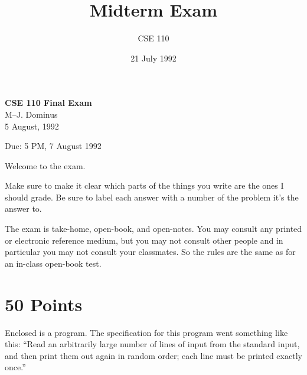 

\def\brac#1{$<$#1$>$}
\def\Int{{\tt int}}
\def\int{\brac{\Int}}
\def\int{\brac{\Int}}
\def\Shortint{{\tt short~int}}
\def\shortint{\brac{\Shortint}}
\def\Longint{{\tt long~int}}
\def\longint{\brac{\Longint}}
\def\Float{{\tt float}}
\def\float{\brac{\Float}}
\def\Double{{\tt double}}
\def\double{\brac{\Double}}
\def\Char{{\tt char}}
\def\chr{\brac{\Char}}
\def\Void{{\tt void}}
\def\void{\brac{\Void}}

\def\ptr#1{pointer~to #1}
\def\p2#1{\brac{\ptr#1}}
\def\Ano#1#2{array~of {#1}~#2s}
\def\ano#1#2{\brac{\Ano#1#2}}
\def\Ao#1{array~of #1}
\def\ao#1{\brac{\Ao#1}}

\def\breakhere{\mbox{$\otimes$}}
\parskip 8pt


\topmargin -0.5in
\textheight 9in


\title{Midterm Exam}
\author{CSE 110}
\date{21 July 1992}


\begin{center}
{\Large \bf CSE 110 Final Exam}\\
\vspace{.2in}
{\large M--J. Dominus}\\
\vspace{.2in}
5 August, 1992

Due: 5 PM, 7 August 1992
\end{center}

Welcome to the exam. 

Make sure to make it clear which parts of the things you write are the
ones I should grade.  Be sure to label each answer with a number of the
problem it's the answer to.

The exam is take-home, open-book, and open-notes.  You may consult any
printed or electronic reference medium, but you may not consult other
people and in particular you may not consult your classmates.  So the
rules are the same as for an in-class open-book test.

\section{50 Points}

Enclosed is a program.  The specification for this program went
something like this: ``Read an arbitrarily large number of lines of
input from the standard input, and then print them out again in random
order; each line must be printed exactly once.''

